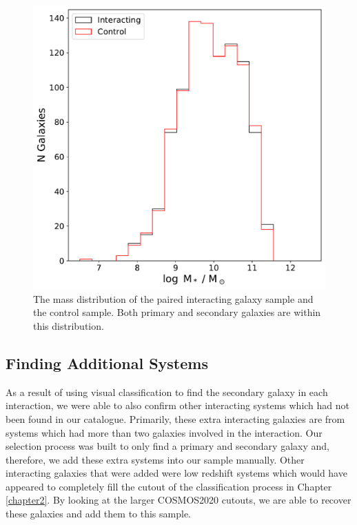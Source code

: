 \begin{figure}
\centering
\includegraphics[width=\textwidth]{Chapter3/figures/mass-matching-pairs.pdf}
\caption[The mass distribution of the paired interacting galaxy sample and the control sample.]{The mass distribution of the paired interacting galaxy sample and the control sample. Both primary and secondary galaxies are within this distribution.}
\label{fig:matched-distributions}
\end{figure}

\subsection{Finding Additional Systems}
\noindent As a result of using visual classification to find the secondary galaxy in each interaction, we were able to also confirm other interacting systems which had not been found in our catalogue. Primarily, these extra interacting galaxies are from systems which had more than two galaxies involved in the interaction. Our selection process was built to only find a primary and secondary galaxy and, therefore, we add these extra systems into our sample manually. Other interacting galaxies that were added were low redshift systems which would have appeared to completely fill the cutout of the classification process in Chapter \ref{chapter2}. By looking at the larger COSMOS2020 cutouts, we are able to recover these galaxies and add them to this sample.

